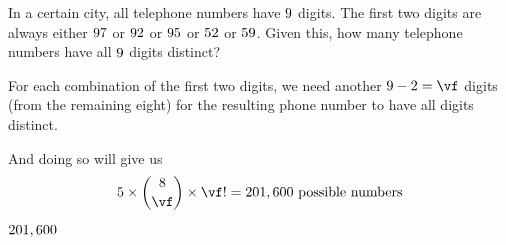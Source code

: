 

\SUBTRACT{}\vf

\question[2] In a certain city, all telephone numbers have $9$ digits. The first two digits
are always either $97$ or $92$ or $95$ or $52$ or 
$59$. Given this, how many telephone numbers have all $9$ digits distinct?


\watchout[-20pt]

\ifprintanswers
\fi 

\begin{solution}[\mcq]
  For each combination of the first two digits, we need another $\ve-2=\vf$ digits (from the remaining eight) 
  for the resulting phone number to have all digits distinct. 

  And doing so will give us 
    \[ 5\times\binom{8}\vf\times\vf! = \vg\text{ possible numbers}\] 
\end{solution}

\ifprintanswers
  \begin{codex}
    $201,600$
  \end{codex}
\fi


